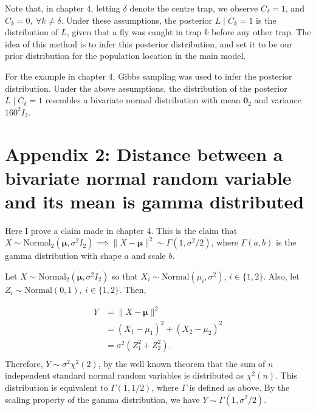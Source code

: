 \documentclass[
  oneside]{book}
\begin{document}
Note that, in chapter 4, letting \(\delta\) denote the centre trap, we observe \(C_\delta=1\), and \(C_k = 0, ~ \forall k \neq \delta\). Under these assumptions, the posterior \(L \mid C_k = 1\) is the distribution of \(L\), given that a fly was caught in trap \(k\) before any other trap. The idea of this method is to infer this posterior distribution, and set it to be our prior distribution for the population location in the main model.

For the example in chapter 4, Gibbs sampling was used to infer the posterior distribution. Under the above assumptions, the distribution of the posterior \(L \mid C_\delta = 1\) resembles a bivariate normal distribution with mean \(\mathbf 0_2\) and variance \(160^2 I_2\).

\hypertarget{appendix-2-distance-between-a-bivariate-normal-random-variable-and-its-mean-is-gamma-distributed}{%
\section{Appendix 2: Distance between a bivariate normal random variable and its mean is gamma distributed}\label{appendix-2-distance-between-a-bivariate-normal-random-variable-and-its-mean-is-gamma-distributed}}

Here I prove a claim made in chapter 4. This is the claim that \(X \sim \mathrm {Normal}_2 (\pmb \mu, \sigma^2 I_2) \implies \lVert X - \pmb \mu \rVert^2 \sim \Gamma(1, \sigma^2/2)\), where \(\Gamma(a, b)\) is the gamma distribution with shape \(a\) and scale \(b\).

Let \(X \sim \mathrm {Normal}_2 (\pmb \mu, \sigma^2 I_2)\) so that \(X_i \sim \mathrm{Normal}(\mu_i, \sigma^2)\), \(i \in \{1, 2\}\). Also, let \(Z_i \sim \mathrm{Normal}(0, 1), ~ i \in \{1, 2\}\). Then,

\[
\begin{aligned}
  Y &= \lVert X - \pmb \mu \rVert^2  \\
    &= (X_1 - \mu_1)^2 + (X_2 - \mu_2)^2 \\
    &= \sigma^2 (Z_1^2 + Z_2^2). \\
\end{aligned}
\]
Therefore, \(Y \sim \sigma^2 \chi^2(2)\), by the well known theorem that the sum of \(n\) independent standard normal random variables is distributed as \(\chi^2(n)\). This distribution is equivalent to \(\Gamma(1, 1/2)\), where \(\Gamma\) is defined as above. By the scaling property of the gamma distribution, we have \(Y \sim \Gamma(1, \sigma^2 / 2)\).
\end{document}

